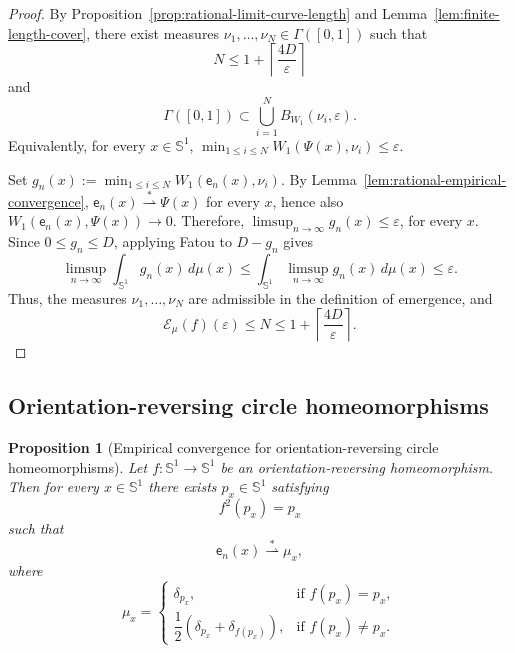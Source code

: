 \documentclass[12pt,a4paper,twoside]{article}
\theoremstyle{plain}
\newtheorem{proposition}[theorem]{Proposition}
\theoremstyle{definition}
\newcommand{\cE}{{\mathcal E}}
\newcommand{\emp}{\mathsf e}
\newcommand{\wto}{\overset{*}{\rightharpoonup}}
\begin{document}
\begin{proof}
By Proposition~\ref{prop:rational-limit-curve-length} and
Lemma~\ref{lem:finite-length-cover}, there exist measures $\nu_1,\dots,\nu_N\in\Gamma([0,1])$ such that
\[
N\le 1+\left\lceil\frac{4D}{\varepsilon}\right\rceil
\]
and
\[
\Gamma([0,1])
\subset
\bigcup_{i=1}^N B_{W_1}(\nu_i,\varepsilon).
\]
Equivalently, for every \(x\in\mathbb S^1\), $\min_{1\le i\le N}W_1(\Psi(x),\nu_i)\le\varepsilon$.

Set $g_n(x):=
\min_{1\le i\le N}W_1(\emp_n(x),\nu_i)$. By Lemma~\ref{lem:rational-empirical-convergence}, \(\emp_n(x)\wto\Psi(x)\)
for every \(x\), hence also \(W_1(\emp_n(x),\Psi(x))\to0\). Therefore, $\limsup_{n\to\infty}g_n(x)
\le
\varepsilon$, for every $x$. Since \(0\le g_n\le D\), applying Fatou to \(D-g_n\) gives
\[
\limsup_{n\to\infty}
\int_{\mathbb S^1}g_n(x)\,d\mu(x)
\le
\int_{\mathbb S^1}\limsup_{n\to\infty}g_n(x)\,d\mu(x)
\le
\varepsilon.
\]
Thus, the measures \(\nu_1,\dots,\nu_N\) are admissible in the definition of
emergence, and
\[
\cE_\mu(f)(\varepsilon)
\le
N
\le
1+\left\lceil\frac{4D}{\varepsilon}\right\rceil.
\]\end{proof}

\subsection{Orientation-reversing circle homeomorphisms}

\begin{proposition}[Empirical convergence for orientation-reversing circle homeomorphisms]
\label{prop:circle-reversing-empirical}
Let \(f:\mathbb S^1\to\mathbb S^1\) be an orientation-reversing
homeomorphism. Then for every \(x\in\mathbb S^1\) there exists
\(p_x\in\mathbb S^1\) satisfying
\[
f^2(p_x)=p_x
\]
such that
\[
\emp_n(x)\wto \mu_x,
\]
where
\[
\mu_x=
\begin{cases}
\delta_{p_x}, & \text{if }f(p_x)=p_x,\\[0.3em]
\dfrac12(\delta_{p_x}+\delta_{f(p_x)}),
& \text{if }f(p_x)\neq p_x.
\end{cases}
\]
\end{proposition}
\end{document}
